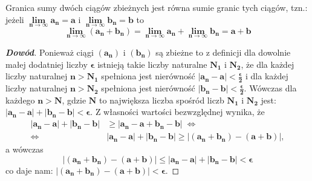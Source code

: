 \begin{theorem}
Granica sumy dwóch ciągów zbieżnych jest równa sumie granic tych ciągów, tzn.: jeżeli
$\boldsymbol{\lim\limits_{n\to \infty }a_{n}=a}$ i $\boldsymbol{\lim\limits_{n\to \infty }b_{n}=b}$ to
\[
\boldsymbol{\lim\limits_{n\to \infty }\left (a_{n}+b_{n}\right)=\lim\limits_{n\to \infty }a_{n}+\lim\limits_{n\to \infty }b_{n}=a+b}
\]
\end{theorem}
\begin{proof}[\textbf{Dowód}]
Ponieważ ciągi $\boldsymbol{\left (a_{n} \right)}$ i $\boldsymbol{\left (b_{n} \right)}$ 
są zbieżne to z definicji dla dowolnie małej dodatniej liczby $\boldsymbol{\epsilon}$ 
istnieją takie liczby naturalne $\boldsymbol{N_{1}}$ i $\boldsymbol{N_{2}}$, że dla 
każdej liczby naturalnej $\boldsymbol{n>N_{1}}$ spełniona jest nierówność $\boldsymbol{\left |a_{n}-a \right|<\frac{\epsilon}{2}}$ 
i dla każdej liczby naturalnej $\boldsymbol{n>N_{2}}$ spełniona jest nierówność 
$\boldsymbol{\left | b_{n}-b\right|<\frac{\epsilon}{2}}$. 
Wówczas dla każdego $\boldsymbol{n>N}$, gdzie $\boldsymbol{N}$ to 
największa liczba spośród liczb $\boldsymbol{N_{1}}$ i $\boldsymbol{N_{2}}$ jest:
$\boldsymbol{\left |a_{n}-a \right|+\left |b_{n}-b \right|<\epsilon}$. 
Z własności wartości bezwzględnej wynika, że
\begin{align}
 \boldsymbol{\left |a_{n}-a \right|+\left |b_{n}-b \right|}
 &\boldsymbol{\geqslant \left |a_{n}-a+b_{n}-b \right|} \; \Leftrightarrow \\
\Leftrightarrow\;
&\boldsymbol{\left |a_{n}-a \right|+\left |b_{n}-b \right|\geqslant \left |\left (a_{n}+b_{n} \right)-\left (a+b \right) \right|}, 
\end{align}
a wówczas 
\[
\boldsymbol{\left |\left (a_{n}+b_{n} \right)-\left (a+b \right) \right|\leqslant \left |a_{n}-a \right|+\left |b_{n}-b \right|<\epsilon} 
\]
co daje nam: $\boldsymbol{\left |\left (a_{n}+b_{n} \right)-\left (a+b \right) \right|<\epsilon}$.
\end{proof}